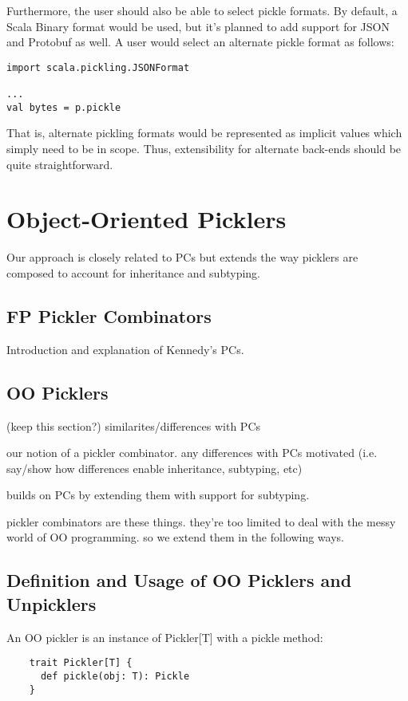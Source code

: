 \documentclass[preprint,10pt]{sigplanconf}
\begin{document}
Furthermore, the user should also be able to select pickle formats. By
default, a Scala Binary format would be used, but it's planned to add
support for JSON and Protobuf as well. A user would select an
alternate pickle format as follows:

\begin{verbatim}
import scala.pickling.JSONFormat

...
val bytes = p.pickle
\end{verbatim}\noindent

That is, alternate pickling formats would be represented as implicit
values which simply need to be in scope. Thus, extensibility for
alternate back-ends should be quite straightforward.

\section{Object-Oriented Picklers}
Our approach is closely related to PCs but extends the way picklers are composed to account for inheritance and subtyping.

\subsection{FP Pickler Combinators}
Introduction and explanation of Kennedy's PCs.

\subsection{OO Picklers}
(keep this section?) similarites/differences with PCs

our notion of a pickler combinator. any differences with PCs motivated (i.e. say/show how differences enable inheritance, subtyping, etc)

builds on PCs by extending them with support for subtyping.

pickler combinators are these things. they're too limited to deal with the messy world of OO programming. so we extend them in the following ways.

\subsection{Definition and Usage of OO Picklers and Unpicklers}

An OO pickler is an instance of Pickler[T] with a pickle method:

\begin{verbatim}
    trait Pickler[T] {
      def pickle(obj: T): Pickle
    }
\end{verbatim}
\end{document}
